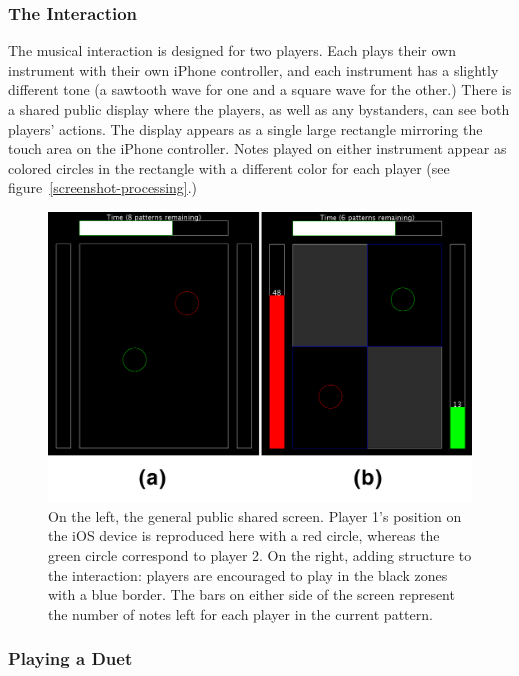 \documentclass{article}
\begin{document}
\subsubsection{The Interaction}

The musical interaction is designed for two players.  Each plays their own instrument with their own iPhone controller, and each instrument has a slightly different tone (a sawtooth wave for one and a square wave for the other.)  There is a shared public display where the players, as well as any bystanders, can see both players' actions.  The display appears as a single large rectangle mirroring the touch area on the iPhone controller.  Notes played on either instrument appear as colored circles in the rectangle with a different color for each player (see figure~\ref{screenshot-processing}.)

\begin{figure}[tb]
\includegraphics[width=\columnwidth]{screenshot-processing.png}
\caption{On the left, the general public shared screen. Player 1's position on the iOS device is reproduced here with a red circle, whereas the green circle correspond to player 2. On the right, adding structure to the interaction: players are encouraged to play in the black zones with a blue border. The bars on either side of the screen represent the number of notes left for each player in the current pattern.}
\label{struct}
\end{figure}

\subsubsection{Playing a Duet}
\end{document}
